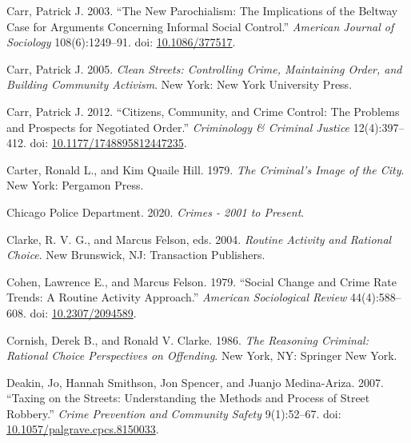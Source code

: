 \documentclass [11pt, proquest] {uwthesis}[2015/03/03]
\newlength{\cslhangindent}
\newenvironment{CSLReferences}[2]%
{\setlength{\parindent}{0pt}%
\everypar{\setlength{\hangindent}{\cslhangindent}}\ignorespaces}%
{\par}
\begin{document}
\begin{CSLReferences}{1}{0}
\leavevmode\hypertarget{ref-carrNewParochialismImplications2003}{}%
Carr, Patrick J. 2003. {``The {New Parochialism}: {The Implications} of the {Beltway Case} for {Arguments Concerning Informal Social Control}.''} \emph{American Journal of Sociology} 108(6):1249--91. doi: \href{https://doi.org/10.1086/377517}{10.1086/377517}.

\leavevmode\hypertarget{ref-carrCleanStreetsControlling2005}{}%
Carr, Patrick J. 2005. \emph{Clean {Streets}: {Controlling Crime}, {Maintaining Order}, and {Building Community Activism}}. {New York}: {New York University Press}.

\leavevmode\hypertarget{ref-carrCitizensCommunityCrime2012}{}%
Carr, Patrick J. 2012. {``Citizens, {Community}, and {Crime Control}: {The Problems} and {Prospects} for {Negotiated Order}.''} \emph{Criminology \& Criminal Justice} 12(4):397--412. doi: \href{https://doi.org/10.1177/1748895812447235}{10.1177/1748895812447235}.

\leavevmode\hypertarget{ref-carterCriminalImageCity1979}{}%
Carter, Ronald L., and Kim Quaile Hill. 1979. \emph{The Criminal's Image of the City}. {New York}: {Pergamon Press}.

\leavevmode\hypertarget{ref-Crimes2001Present2020}{}%
{Chicago Police Department}. 2020. \emph{Crimes - 2001 to {Present}}.

\leavevmode\hypertarget{ref-clarkeRoutineActivityRational2004}{}%
Clarke, R. V. G., and Marcus Felson, eds. 2004. \emph{Routine Activity and Rational Choice}. {New Brunswick, NJ}: {Transaction Publishers}.

\leavevmode\hypertarget{ref-cohenSocialChangeCrime1979}{}%
Cohen, Lawrence E., and Marcus Felson. 1979. {``Social {Change} and {Crime Rate Trends}: {A Routine Activity Approach}.''} \emph{American Sociological Review} 44(4):588--608. doi: \href{https://doi.org/10.2307/2094589}{10.2307/2094589}.

\leavevmode\hypertarget{ref-cornishReasoningCriminalRational1986}{}%
Cornish, Derek B., and Ronald V. Clarke. 1986. \emph{The {Reasoning Criminal}: {Rational Choice Perspectives} on {Offending}}. {New York, NY}: {Springer New York}.

\leavevmode\hypertarget{ref-deakinTaxingStreetsUnderstanding2007}{}%
Deakin, Jo, Hannah Smithson, Jon Spencer, and Juanjo Medina-Ariza. 2007. {``Taxing on the {Streets}: {Understanding} the {Methods} and {Process} of {Street Robbery}.''} \emph{Crime Prevention and Community Safety} 9(1):52--67. doi: \href{https://doi.org/10.1057/palgrave.cpcs.8150033}{10.1057/palgrave.cpcs.8150033}.


\end{CSLReferences}
\end{document}
